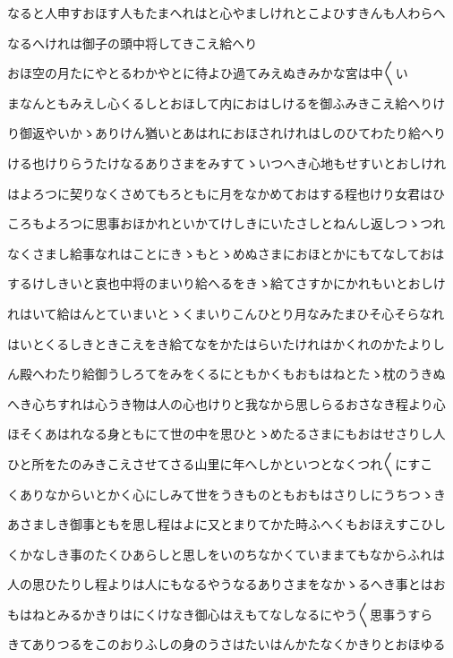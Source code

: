 \documentclass[a4paper,11pt,landscape]{ltjtarticle}
\begin{document}
なると人申すおほす人もたまへれはと心やましけれとこよひすきんも人わらへ
\par\medskip
なるへけれは御子の頭中将してきこえ給へり
\par\medskip
おほ空の月たにやとるわかやとに待よひ過てみえぬきみかな宮は中〱い
\par\medskip
まなんともみえし心くるしとおほして内におはしけるを御ふみきこえ給へりけ
\par\medskip
り御返やいかゝありけん猶いとあはれにおほされけれはしのひてわたり給へり
\par\medskip
ける也けりらうたけなるありさまをみすてゝいつへき心地もせすいとおしけれ
\par\medskip
はよろつに契りなくさめてもろともに月をなかめておはする程也けり女君はひ
\par\medskip
ころもよろつに思事おほかれといかてけしきにいたさしとねんし返しつゝつれ
\par\medskip
なくさまし給事なれはことにきゝもとゝめぬさまにおほとかにもてなしておは
\par\medskip
するけしきいと哀也中将のまいり給へるをきゝ給てさすかにかれもいとおしけ
\par\medskip
れはいて給はんとていまいとゝくまいりこんひとり月なみたまひそ心そらなれ
\par\medskip
はいとくるしきときこえをき給てなをかたはらいたけれはかくれのかたよりし
\par\medskip
ん殿へわたり給御うしろてをみをくるにともかくもおもはねとたゝ枕のうきぬ
\par\medskip
へき心ちすれは心うき物は人の心也けりと我なから思しらるおさなき程より心
\par\medskip
ほそくあはれなる身ともにて世の中を思ひとゝめたるさまにもおはせさりし人
\par\medskip
ひと所をたのみきこえさせてさる山里に年へしかといつとなくつれ〱にすこ
\par\medskip
くありなからいとかく心にしみて世をうきものともおもはさりしにうちつゝき
\par\medskip
あさましき御事ともを思し程はよに又とまりてかた時ふへくもおほえすこひし
\par\medskip
くかなしき事のたくひあらしと思しをいのちなかくていままてもなからふれは
\par\medskip
人の思ひたりし程よりは人にもなるやうなるありさまをなかゝるへき事とはお
\par\medskip
もはねとみるかきりはにくけなき御心はえもてなしなるにやう〱思事うすら
\par\medskip
きてありつるをこのおりふしの身のうさはたいはんかたなくかきりとおほゆる
\end{document}
